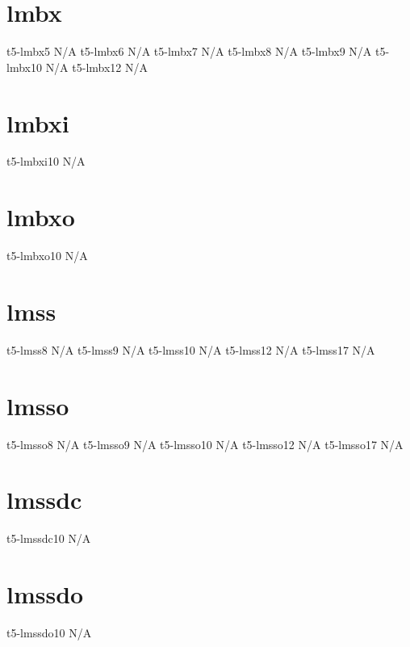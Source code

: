 \documentclass[sample]{vnsample}
\begin{document}
\section{lmbx}
     {t5-lmbx5}           {N/A}
     {t5-lmbx6}           {N/A}
     {t5-lmbx7}           {N/A}
     {t5-lmbx8}           {N/A}
     {t5-lmbx9}           {N/A}
     {t5-lmbx10}          {N/A}
     {t5-lmbx12}          {N/A}

\section{lmbxi}
    {t5-lmbxi10}         {N/A}

\section{lmbxo}
    {t5-lmbxo10}         {N/A}

\section{lmss}
     {t5-lmss8}           {N/A}
     {t5-lmss9}           {N/A}
     {t5-lmss10}          {N/A}
     {t5-lmss12}          {N/A}
     {t5-lmss17}          {N/A}

\section{lmsso}
    {t5-lmsso8}          {N/A}
    {t5-lmsso9}          {N/A}
    {t5-lmsso10}         {N/A}
    {t5-lmsso12}         {N/A}
    {t5-lmsso17}         {N/A}

\section{lmssdc}
   {t5-lmssdc10}        {N/A}

\section{lmssdo}
  {t5-lmssdo10}        {N/A}
\end{document}
